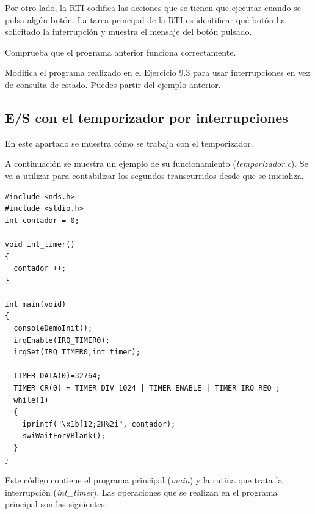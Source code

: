 Por otro lado, la RTI codifica las acciones que se tienen que ejecutar cuando se pulsa algún  botón. La tarea principal de la RTI es identificar qué botón ha solicitado la interrupción y muestra el mensaje del botón pulsado.

\begin{exercise}
	Comprueba que el programa anterior funciona correctamente.
\end{exercise}

\begin{exercise}
Modifica el programa realizado en el Ejercicio 9.3 para usar interrupciones en vez de consulta de estado. Puedes partir del ejemplo anterior.
\end{exercise}

\subsection{E/S con el temporizador por interrupciones}

En este apartado se muestra cómo se trabaja con el temporizador. 

\begin{example}
A continuación se muestra un ejemplo de su funcionamiento (\textit{temporizador.c}). Se va a utilizar para contabilizar los segundos transcurridos desde que se inicializa. 

\begin{lstlisting}
#include <nds.h>
#include <stdio.h>
int contador = 0;

void int_timer() 
{
  contador ++;
}

int main(void) 
{
  consoleDemoInit();
  irqEnable(IRQ_TIMER0);
  irqSet(IRQ_TIMER0,int_timer); 

  TIMER_DATA(0)=32764; 
  TIMER_CR(0) = TIMER_DIV_1024 | TIMER_ENABLE | TIMER_IRQ_REQ ;
  while(1) 
  {
    iprintf("\x1b[12;2H%2i", contador);
    swiWaitForVBlank();
  }
}
\end{lstlisting}
\end{example}

Este código contiene el programa principal (\textit{main}) y la rutina que trata la interrupción (\textit{int\_timer}). Las operaciones que se realizan en el programa principal son las siguientes:

